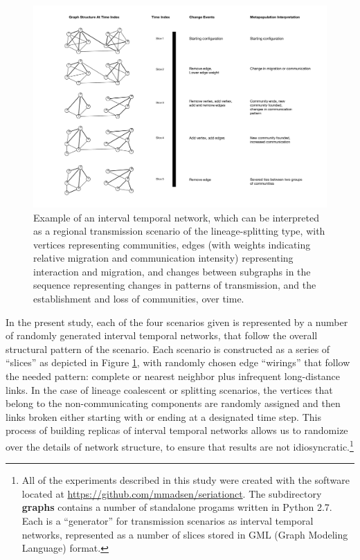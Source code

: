     \begin{figure}[ht]
    \centering
    \includegraphics[scale=0.25]{graphics/multipleseriation/interval-temporal-network-with-interpretation.pdf}
    \caption{Example of an interval temporal network, which can be interpreted as a regional transmission scenario of the lineage-splitting type, with vertices representing communities, edges (with weights indicating relative migration and communication intensity) representing interaction and migration, and changes between subgraphs in the sequence representing changes in patterns of transmission, and the establishment and loss of communities, over time.}
    \label{metapop:fig:itn-example}
    \end{figure}
    
    
    In the present study, each of the four scenarios given is represented by a number of randomly generated interval temporal networks, that follow the overall structural pattern of the scenario.  Each scenario is constructed as a series of ``slices'' as depicted in Figure \ref{metapop:fig:itn-example}, with randomly chosen edge ``wirings'' that follow the needed pattern:  complete or nearest neighbor plus infrequent long-distance links.  In the case of lineage coalescent or splitting scenarios, the vertices that belong to the non-communicating components are randomly assigned and then links broken either starting with or ending at a designated time step.  This process of building replicas of interval temporal networks allows us to randomize over the details of network structure, to ensure that results are not idiosyncratic.\footnote{All of the experiments described in this study were created with the software located at \url{https://github.com/mmadsen/seriationct}.  The subdirectory \textbf{graphs} contains a number of standalone progams written in Python 2.7.  Each is a ``generator'' for transmission scenarios as interval temporal networks, represented as a number of slices stored in GML (Graph Modeling Language) format.}
    
